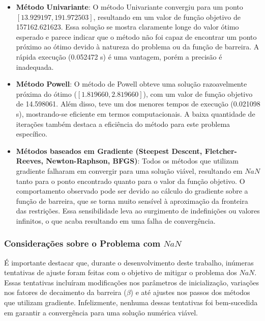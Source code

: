 \documentclass[a4paper, 12pt]{article}
\begin{document}
\begin{itemize}
    \item \textbf{Método Univariante}: O método Univariante convergiu para um ponto \\ \( [13.929197, 191.972503] \), resultando em um valor de função objetivo de 157162.621623. Essa solução se mostra claramente longe do valor ótimo esperado e parece indicar que o método não foi capaz de encontrar um ponto próximo ao ótimo devido à natureza do problema ou da função de barreira. A rápida execução (0.052472 s) é uma vantagem, porém a precisão é inadequada.
    
    \item \textbf{Método Powell}: O método de Powell obteve uma solução razoavelmente próxima do ótimo (\( [1.819660, 2.819660] \)), com um valor de função objetivo de 14.598061. Além disso, teve um dos menores tempos de execução (0.021098 s), mostrando-se eficiente em termos computacionais. A baixa quantidade de iterações também destaca a eficiência do método para este problema específico.

    \item \textbf{Métodos baseados em Gradiente (Steepest Descent, Fletcher-Reeves, Newton-Raphson, BFGS)}: Todos os métodos que utilizam gradiente falharam em convergir para uma solução viável, resultando em \( NaN \) tanto para o ponto encontrado quanto para o valor da função objetivo. O comportamento observado pode ser devido ao cálculo do gradiente sobre a função de barreira, que se torna muito sensível à aproximação da fronteira das restrições. Essa sensibilidade leva ao surgimento de indefinições ou valores infinitos, o que acaba resultando em uma falha de convergência. 
\end{itemize}

\subsubsection{Considerações sobre o Problema com \( NaN \)}

É importante destacar que, durante o desenvolvimento deste trabalho, inúmeras tentativas de ajuste foram feitas com o objetivo de mitigar o problema dos \( NaN \). Essas tentativas incluíram modificações nos parâmetros de inicialização, variações nos fatores de decaimento da barreira (\( \beta \)) e até ajustes nos passos dos métodos que utilizam gradiente. Infelizmente, nenhuma dessas tentativas foi bem-sucedida em garantir a convergência para uma solução numérica viável.\\
\end{document}
